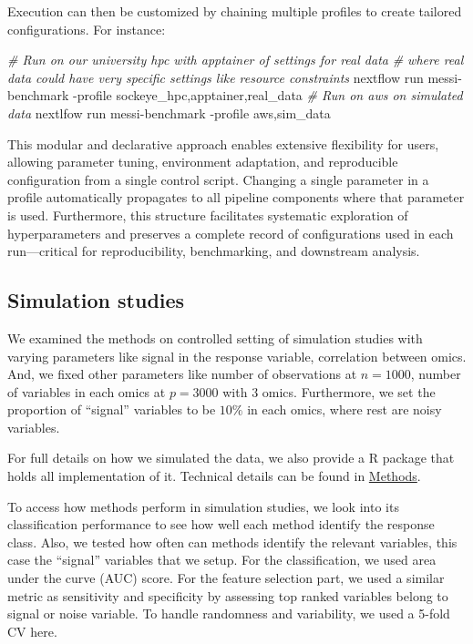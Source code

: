 \documentclass[
]{article}
\newenvironment{Shaded}{\begin{snugshade}}{\end{snugshade}}
\newcommand{\AttributeTok}[1]{\textcolor[rgb]{0.13,0.29,0.53}{#1}}
\newcommand{\CommentTok}[1]{\textcolor[rgb]{0.56,0.35,0.01}{\textit{#1}}}
\newcommand{\ExtensionTok}[1]{#1}
\newcommand{\NormalTok}[1]{#1}
\begin{document}
Execution can then be customized by chaining multiple profiles to create tailored configurations. For instance:

\begin{Shaded}
\begin{Highlighting}[]
\CommentTok{\# Run on our university hpc with apptainer of settings for real data }
\CommentTok{\# where real data could have very specific settings like resource constraints}
\ExtensionTok{nextflow}\NormalTok{ run messi{-}benchmark }\AttributeTok{{-}profile}\NormalTok{ sockeye\_hpc,apptainer,real\_data}
\CommentTok{\# Run on aws on simulated data}
\ExtensionTok{nextlfow}\NormalTok{ run messi{-}benchmark }\AttributeTok{{-}profile}\NormalTok{ aws,sim\_data}
\end{Highlighting}
\end{Shaded}

This modular and declarative approach enables extensive flexibility for users, allowing parameter tuning, environment adaptation, and reproducible configuration from a single control script. Changing a single parameter in a profile automatically propagates to all pipeline components where that parameter is used. Furthermore, this structure facilitates systematic exploration of hyperparameters and preserves a complete record of configurations used in each run---critical for reproducibility, benchmarking, and downstream analysis.

\hypertarget{simulation-studies}{%
\subsection{Simulation studies}\label{simulation-studies}}

We examined the methods on controlled setting of simulation studies with varying parameters like signal in the response variable, correlation between omics. And, we fixed other parameters like number of observations at \(n = 1000\), number of variables in each omics at \(p = 3000\) with \(3\) omics. Furthermore, we set the proportion of ``signal'' variables to be \(10\%\) in each omics, where rest are noisy variables.

For full details on how we simulated the data, we also provide a R package that holds all implementation of it. Technical details can be found in \protect\hyperlink{methods}{Methods}.

To access how methods perform in simulation studies, we look into its classification performance to see how well each method identify the response class. Also, we tested how often can methods identify the relevant variables, this case the ``signal'' variables that we setup. For the classification, we used area under the curve (AUC) score. For the feature selection part, we used a similar metric as sensitivity and specificity by assessing top ranked variables belong to signal or noise variable. To handle randomness and variability, we used a 5-fold CV here.
\end{document}
